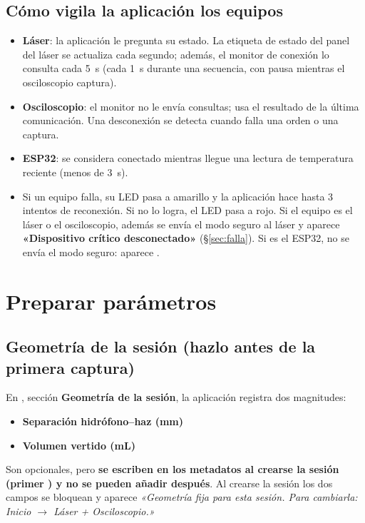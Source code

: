 \documentclass[11pt]{article}
\newcommand{\btn}[1]{\btnbox{#1}}
\begin{document}
\subsection*{Cómo vigila la aplicación los equipos}
\begin{itemize}
  \item \textbf{Láser}: la aplicación le pregunta su estado. La etiqueta de estado del panel del láser se actualiza cada segundo; además, el monitor de conexión lo consulta cada 5~s (cada 1~s durante una secuencia, con pausa mientras el osciloscopio captura).
  \item \textbf{Osciloscopio}: el monitor no le envía consultas; usa el resultado de la última comunicación. Una desconexión se detecta cuando falla una orden o una captura.
  \item \textbf{ESP32}: se considera conectado mientras llegue una lectura de temperatura reciente (menos de 3~s).
  \item Si un equipo falla, su LED pasa a amarillo y la aplicación hace hasta 3 intentos de reconexión. Si no lo logra, el LED pasa a rojo. Si el equipo es el láser o el osciloscopio, además se envía el modo seguro al láser y aparece \textbf{«Dispositivo crítico desconectado»} (\S\ref{sec:falla}). Si es el ESP32, no se envía el modo seguro: aparece \btn{$\circlearrowleft$ Reconectar}.
\end{itemize}

\section{Preparar parámetros}\label{sec:parametros}
\subsection*{Geometría de la sesión (hazlo antes de la primera captura)}
En \btn{$\equiv$ Parámetros}, sección \textbf{Geometría de la sesión}, la aplicación registra dos magnitudes:
\begin{itemize}
  \item \textbf{Separación hidrófono--haz (mm)}
  \item \textbf{Volumen vertido (mL)}
\end{itemize}
Son opcionales, pero \textbf{se escriben en los metadatos al crearse la sesión (primer \btn{Guardar}) y no se pueden añadir después}. Al crearse la sesión los dos campos se bloquean y aparece \textit{«Geometría fija para esta sesión. Para cambiarla: Inicio $\rightarrow$ Láser + Osciloscopio.»}
\end{document}
